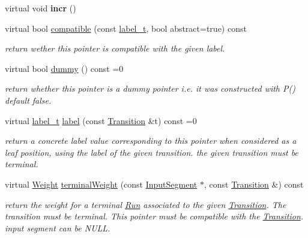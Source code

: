\begin{DoxyCompactItemize}
\mbox{\label{classPointer_a02c73f5f2b21a1fe37b744383508cb64}} 
virtual void {\bfseries incr} ()
\item 
virtual bool \mbox{\hyperlink{classPointer_a7b636072b492b57efe3ead47e03a67bd}{compatible}} (const \mbox{\hyperlink{group__output_ga22fde970e635fcf63962743b2d5c441d}{label\+\_\+t}}, bool abstract=true) const
\begin{DoxyCompactList}\small\item\em return wether this pointer is compatible with the given label. \end{DoxyCompactList}\item 
\mbox{\label{classPointer_afa7a38cfee7181aa05e3634a15066135}} 
virtual bool \mbox{\hyperlink{classPointer_afa7a38cfee7181aa05e3634a15066135}{dummy}} () const =0
\begin{DoxyCompactList}\small\item\em return whether this pointer is a dummy pointer i.\+e. it was constructed with P() default false. \end{DoxyCompactList}\item 
\mbox{\label{classPointer_a767e1ca8f18a9cf07eaca5ae44f689cf}} 
virtual \mbox{\hyperlink{group__output_ga22fde970e635fcf63962743b2d5c441d}{label\+\_\+t}} \mbox{\hyperlink{classPointer_a767e1ca8f18a9cf07eaca5ae44f689cf}{label}} (const \mbox{\hyperlink{classTransition}{Transition}} \&t) const =0
\begin{DoxyCompactList}\small\item\em return a concrete label value corresponding to this pointer when considered as a leaf position, using the label of the given transition. the given transition must be terminal. \end{DoxyCompactList}\item 
virtual \mbox{\hyperlink{classWeight}{Weight}} \mbox{\hyperlink{group__table_ga4ca596fe52abd36d550a10818678d54c}{terminal\+Weight}} (const \mbox{\hyperlink{classInputSegment}{Input\+Segment}} $\ast$, const \mbox{\hyperlink{classTransition}{Transition}} \&) const
\begin{DoxyCompactList}\small\item\em return the weight for a terminal \mbox{\hyperlink{classRun}{Run}} associated to the given \mbox{\hyperlink{classTransition}{Transition}}. The transition must be terminal. This pointer must be compatible with the \mbox{\hyperlink{classTransition}{Transition}}. input segment can be N\+U\+LL. \end{DoxyCompactList}\item 

\end{DoxyCompactItemize}
